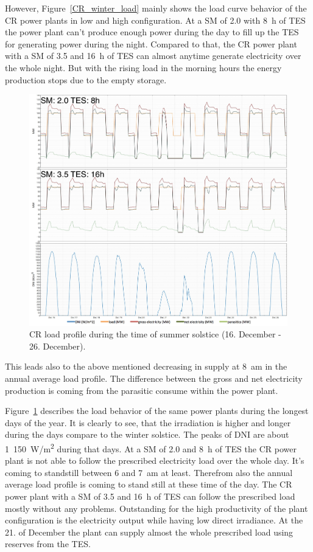 However, Figure~\ref{CR_winter_load} mainly shows the load curve behavior of the CR power plants in low and high configuration. At a SM of 2.0 with 8~h of TES the power plant can't produce enough power during the day to fill up the TES for generating power during the night. Compared to that, the CR power plant with a SM of 3.5 and 16~h of TES can almost anytime generate electricity over the whole night. But with the rising load in the morning hours the energy production stops due to the empty storage. 
\begin{figure}[htbp]  
\centering
\includegraphics[width=1\linewidth]{FIG/CR_summer_load}
\caption[CR load profile during the time of summer solstice (16. December - 26. December).]{CR load profile during the time of summer solstice (16. December - 26. December).}\label{CR_summer_load}
\end{figure}
This leads also to the above mentioned decreasing in supply at 8~am in the annual average load profile. The difference between the gross and net electricity production is coming from the parasitic consume within the power plant.

Figure~\ref{CR_summer_load} describes the load behavior of the  same power plants during the longest days of the year. It is clearly to see, that the irradiation is higher and longer during the days compare to the winter solstice. The peaks of DNI are about 1~150~W/m\textsuperscript{2} during that days. At a SM of 2.0 and 8~h of TES the CR power plant is not able to follow the prescribed electricity load over the whole day. It's coming to standstill between 6 and 7~am at least. Therefrom also the annual average load profile is coming to stand still at these time of the day. The CR power plant with a SM of 3.5 and 16~h of TES can follow the prescribed load mostly without any problems. Outstanding for the high productivity of the plant configuration is the electricity output while having low direct irradiance. At the 21. of December the plant can supply almost the whole prescribed load using reserves from the TES.

